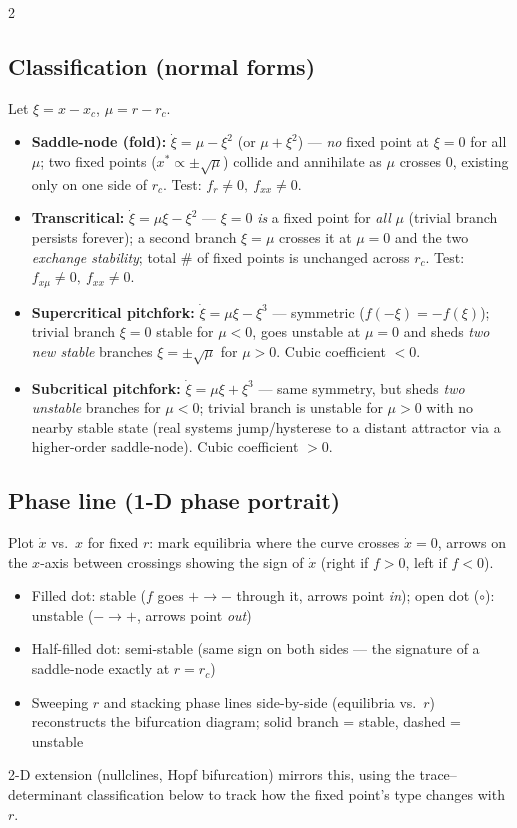 \documentclass[10pt]{article}
\begin{document}
\begin{multicols}{2}
\subsection*{Classification (normal forms)}
Let $\xi=x-x_c$, $\mu=r-r_c$.
\begin{itemize}[nosep, leftmargin=1.1em]
    \item \textbf{Saddle-node (fold):} $\dot\xi=\mu-\xi^2$ (or $\mu+\xi^2$) --- \emph{no} fixed point at $\xi=0$ for all $\mu$; two fixed points ($x^*\propto\pm\sqrt\mu$) collide and annihilate as $\mu$ crosses $0$, existing only on one side of $r_c$. Test: $f_r\neq0,\ f_{xx}\neq0$.
    \item \textbf{Transcritical:} $\dot\xi=\mu\xi-\xi^2$ --- $\xi=0$ \emph{is} a fixed point for \emph{all} $\mu$ (trivial branch persists forever); a second branch $\xi=\mu$ crosses it at $\mu=0$ and the two \emph{exchange stability}; total \# of fixed points is unchanged across $r_c$. Test: $f_{x\mu}\neq0,\ f_{xx}\neq0$.
    \item \textbf{Supercritical pitchfork:} $\dot\xi=\mu\xi-\xi^3$ --- symmetric ($f(-\xi)=-f(\xi)$); trivial branch $\xi=0$ stable for $\mu<0$, goes unstable at $\mu=0$ and sheds \emph{two new stable} branches $\xi=\pm\sqrt\mu$ for $\mu>0$. Cubic coefficient $<0$.
    \item \textbf{Subcritical pitchfork:} $\dot\xi=\mu\xi+\xi^3$ --- same symmetry, but sheds \emph{two unstable} branches for $\mu<0$; trivial branch is unstable for $\mu>0$ with no nearby stable state (real systems jump/hysterese to a distant attractor via a higher-order saddle-node). Cubic coefficient $>0$.
\end{itemize}

\subsection*{Phase line (1-D phase portrait)}
Plot $\dot x$ vs.\ $x$ for fixed $r$: mark equilibria where the curve crosses $\dot x=0$, arrows on the $x$-axis between crossings showing the sign of $\dot x$ (right if $f>0$, left if $f<0$).
\begin{itemize}[nosep, leftmargin=1.1em]
    \item Filled dot: stable ($f$ goes $+\to-$ through it, arrows point \emph{in}); open dot ($\circ$): unstable ($-\to+$, arrows point \emph{out})
    \item Half-filled dot: semi-stable (same sign on both sides --- the signature of a saddle-node exactly at $r=r_c$)
    \item Sweeping $r$ and stacking phase lines side-by-side (equilibria vs.\ $r$) reconstructs the bifurcation diagram; solid branch = stable, dashed = unstable
\end{itemize}
2-D extension (nullclines, Hopf bifurcation) mirrors this, using the trace--determinant classification below to track how the fixed point's type changes with $r$.


\end{multicols}
\end{document}
